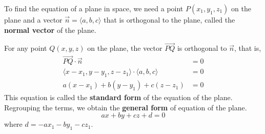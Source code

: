 \documentclass{report}
\begin{document}
\begin{center}
\end{center}

To find the equation of a plane in space, we need a point $P(x_1, y_1, z_1)$ on
the plane and a vector $\vec{n} = \langle a, b, c \rangle$ that is orthogonal
to the plane, called the \textbf{normal vector} of the plane.

For any point $Q(x, y, z)$ on the plane, the vector $\overrightarrow{PQ}$ is
orthogonal to $\vec{n}$, that is,
\begin{align*}
    \overrightarrow{PQ} \cdot \vec{n}                                       & = 0 \\
    \langle x - x_1, y - y_1, z - z_1 \rangle \cdot \langle a, b, c \rangle & = 0 \\
    a(x - x_1) + b(y - y_1) + c(z - z_1)                                    & = 0
\end{align*}
This equation is called the \textbf{standard form} of the equation of the plane. Regrouping the terms, we obtain the \textbf{general form} of equation of the plane. \[ax + by + cz + d = 0\] where $d = -ax_1 - by_1 - cz_1$.
\end{document}
